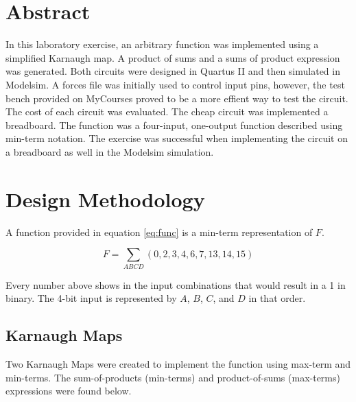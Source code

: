 \documentclass[CMPE]{KGCOEReport}
\begin{document}
\maketitle

\section*{Abstract}
In this laboratory exercise, an arbitrary function was implemented using a simplified Karnaugh map. A product of sums and a sums of product expression was generated. Both circuits were designed in Quartus II and then simulated in Modelsim. A forces file was initially used to control input pins, however, the test bench provided on MyCourses proved to be a more effient way to test the circuit. The cost of each circuit was evaluated. The cheap circuit was implemented a breadboard. The function was a four-input, one-output function described using min-term notation. The exercise was successful when implementing the circuit on a breadboard as well in the Modelsim simulation.

\section*{Design Methodology}

A function provided in equation \ref{eq:func} is a min-term representation of $F$.

\begin{equation}
\label{eq:func}
F = {\sum}_{ABCD} (0,2,3,4,6,7,13,14,15)
\end{equation}

Every number above shows in the input combinations that would result in a 1 in binary. The 4-bit input is represented by $A$, $B$, $C$, and $D$ in that order.

\subsection*{Karnaugh Maps}

Two Karnaugh Maps were created to implement the function using max-term and min-terms. The sum-of-products (min-terms) and product-of-sums (max-terms) expressions were found below.
\end{document}
